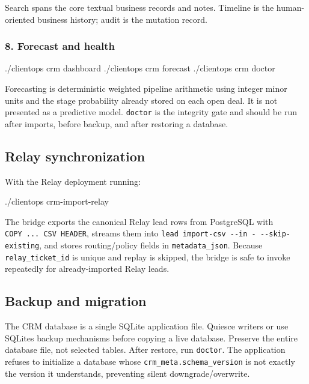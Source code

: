 \documentclass[
]{article}
\newenvironment{Shaded}{}{}
\newcommand{\ExtensionTok}[1]{#1}
\newcommand{\NormalTok}[1]{#1}
\begin{document}
Search spans the core textual business records and notes. Timeline is
the human-oriented business history; audit is the mutation record.

\subsubsection{8. Forecast and health}\label{8-forecast-and-health}

\begin{Shaded}
\begin{Highlighting}[]
\ExtensionTok{./clientops}\NormalTok{ crm dashboard}
\ExtensionTok{./clientops}\NormalTok{ crm forecast}
\ExtensionTok{./clientops}\NormalTok{ crm doctor}
\end{Highlighting}
\end{Shaded}

Forecasting is deterministic weighted pipeline arithmetic using integer
minor units and the stage probability already stored on each open deal.
It is not presented as a predictive model. \texttt{doctor} is the
integrity gate and should be run after imports, before backup, and after
restoring a database.

\subsection{Relay synchronization}\label{relay-synchronization}

With the Relay deployment running:

\begin{Shaded}
\begin{Highlighting}[]
\ExtensionTok{./clientops}\NormalTok{ crm{-}import{-}relay}
\end{Highlighting}
\end{Shaded}

The bridge exports the canonical Relay lead rows from PostgreSQL with
\texttt{COPY\ ...\ CSV\ HEADER}, streams them into
\texttt{lead\ import-csv\ -\/-in\ -\ -\/-skip-existing}, and stores
routing/policy fields in \texttt{metadata\_json}. Because
\texttt{relay\_ticket\_id} is unique and replay is skipped, the bridge
is safe to invoke repeatedly for already-imported Relay leads.

\subsection{Backup and migration}\label{backup-and-migration}

The CRM database is a single SQLite application file. Quiesce writers or
use SQLite\textquotesingle s backup mechanisms before copying a live
database. Preserve the entire database file, not selected tables. After
restore, run \texttt{doctor}. The application refuses to initialize a
database whose \texttt{crm\_meta.schema\_version} is not exactly the
version it understands, preventing silent downgrade/overwrite.
\end{document}
